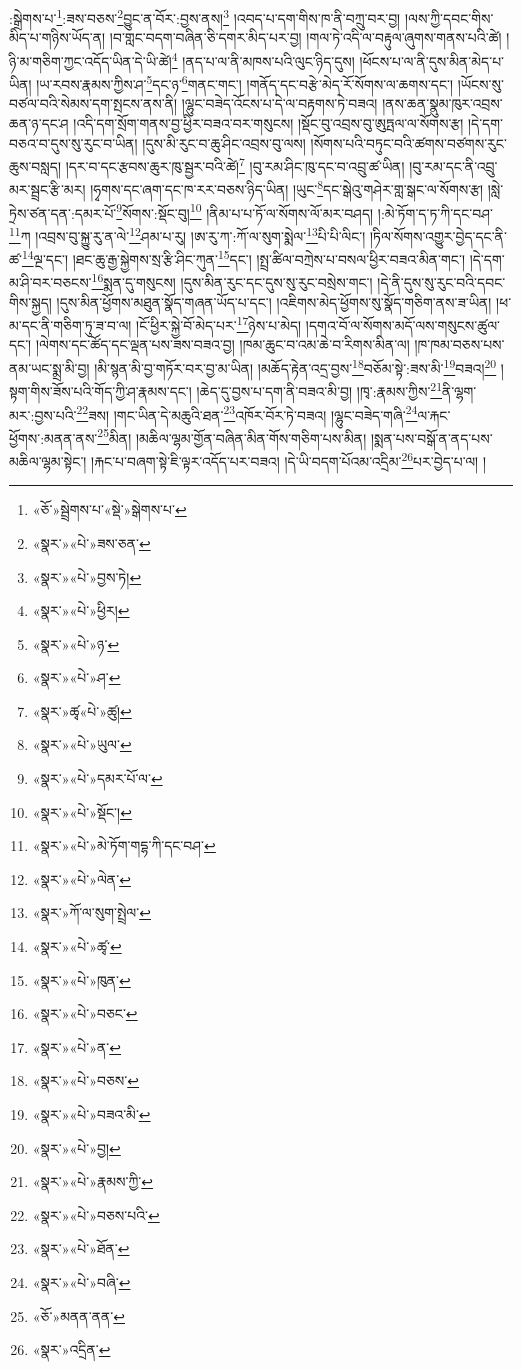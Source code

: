 :སྒྲེགས་པ་\footnote{«ཅོ་»སྦྲེགས་པ་«སྡེ་»སྒེགས་པ་}:ཟས་བཅས་\footnote{«སྣར་»«པེ་»ཟས་ཅན་}བྱུང་ན་བོར་:བྱས་ནས།\footnote{«སྣར་»«པེ་»བྱས་ཏེ།} །འབད་པ་དག་གིས་ཁ་ནི་བཀྲུ་བར་བྱ། །ལས་ཀྱི་དབང་གིས་མིད་པ་གཉིས་ཡོད་ན། །བ་གླང་བདག་བཞིན་ཅི་དགར་མིད་པར་བྱ། །གལ་ཏེ་འདི་ལ་བརྟུལ་ཞུགས་གནས་པའི་ཚེ། །ཉི་མ་གཅིག་ཀྱང་འདོད་ཡིན་དེ་ཡི་ཚེ།\footnote{«སྣར་»«པེ་»ཕྱིར།} །ནད་པ་ལ་ནི་མཁས་པའི་ལུང་ཉིད་དུས། །ཕོངས་པ་ལ་ནི་དུས་མིན་མེད་པ་ཡིན། །ཡ་རབས་རྣམས་ཀྱིས་ཤ་\footnote{«སྣར་»«པེ་»ཉ་}དང་ཉ་\footnote{«སྣར་»«པེ་»ཤ་}གནང་གང་། །གནོད་དང་བརྩེ་མེད་རོ་སོགས་ལ་ཆགས་དང་། །ཡོངས་སུ་བཙལ་བའི་སེམས་དག་སྤངས་ནས་ནི། །ལྷུང་བཟེད་འོངས་པ་དེ་ལ་བརྟགས་ཏེ་བཟའ། །ནས་ཆན་སྣུམ་ཁུར་འབྲས་ཆན་ཉ་དང་ཤ །འདི་དག་སྲོག་གནས་བྱ་ཕྱིར་བཟའ་བར་གསུངས། །སྡོང་བུ་འབྲས་བུ་ཨུཏྤལ་ལ་སོགས་རྩ། །དེ་དག་བཅའ་བ་དུས་སུ་རུང་བ་ཡིན། །དུས་མི་རུང་བ་ཆུ་ཤིང་འབྲས་བུ་ལས། །སོགས་པའི་བཏུང་བའི་ཚགས་བཙགས་རུང་ཆུས་བསླད། །དར་བ་དང་རྩབས་ཆུར་ཁུ་སྦྱར་བའི་ཚེ།\footnote{«སྣར་»ཚྭ«པེ་»ཚུ།} །བུ་རམ་ཤིང་ཁུ་དང་བ་འབྲུ་ཚ་ཡིན། །བུ་རམ་དང་ནི་འབྲུ་མར་སྦྲང་རྩི་མར། །ཧྭགས་དང་ཞག་དང་ཁ་རར་བཅས་ཉིད་ཡིན། །ཡུང་\footnote{«སྣར་»«པེ་»ཡུལ་}དང་སྒེའུ་གཤེར་གླ་སྒང་ལ་སོགས་རྩ། །སླེ་ཏྲེས་ཙན་དན་:དམར་པོ་\footnote{«སྣར་»«པེ་»དམར་པོ་ལ་}སོགས་:སྡོང་བུ།\footnote{«སྣར་»«པེ་»སྡོང་།} །ནིམ་པ་པ་ཏོ་ལ་སོགས་ལོ་མར་བཤད། །:མེ་ཏོག་ད་ཏ་ཀི་དང་བཤ་\footnote{«སྣར་»«པེ་»མེ་ཏོག་གདྷ་ཀི་དང་བཤ་}ཀ །འབྲས་བུ་སྐྱུ་རུ་ན་ལེ་\footnote{«སྣར་»«པེ་»ལེན་}ཤམ་པ་རུ། །ཨ་རུ་ཀ་:ཀོ་ལ་སུག་སྨེལ་\footnote{«སྣར་»ཀོ་ལ་སུག་སྤྲེལ་}པི་པི་ལིང་། །ཏིལ་སོགས་འགྱུར་བྱེད་དང་ནི་ཚ་\footnote{«སྣར་»«པེ་»ཚྭ་}ལྔ་དང་། །ཐང་ཆུ་རྒྱ་སྐྱེགས་སྲ་རྩི་ཤིང་ཀུན་\footnote{«སྣར་»«པེ་»ཁུན་}དང་། །སྤྲ་ཚིལ་བཀྲེས་པ་བསལ་ཕྱིར་བཟའ་མིན་གང་། །དེ་དག་མ་ཤི་བར་བཅངས་\footnote{«སྣར་»«པེ་»བཅང་}སྨན་དུ་གསུངས། །དུས་མིན་རུང་དང་དུས་སུ་རུང་བསྲེས་གང་། །དེ་ནི་དུས་སུ་རུང་བའི་དབང་གིས་སྐྱད། །དུས་མིན་ཕྱོགས་མཐུན་སྣོད་གཞན་ཡོད་པ་དང་། །འཇིགས་མེད་ཕྱོགས་སུ་སྣོད་གཅིག་ནས་ཟ་ཡིན། །ཕ་མ་དང་ནི་གཅིག་ཏུ་ཟ་བ་ལ། །ངོ་ཕྱིར་སྐྱེ་བོ་མེད་པར་\footnote{«སྣར་»«པེ་»ན་}ཉེས་པ་མེད། །དགའ་བོ་ལ་སོགས་མདོ་ལས་གསུངས་ཚུལ་དང་། །ལེགས་དང་ཚོད་དང་ལྡན་པས་ཟས་བཟའ་བྱ། །ཁམ་ཆུང་བ་འམ་ཆེ་བ་རིགས་མིན་ལ། །ཁ་ཁམ་བཅས་པས་ནམ་ཡང་སྨྲ་མི་བྱ། །མི་སྙན་མི་བྱ་གཏོར་བར་བྱ་མ་ཡིན། །མཆོད་རྟེན་འདྲ་བྱས་\footnote{«སྣར་»«པེ་»བཅས་}བཅོམ་སྟེ་:ཟས་མི་\footnote{«སྣར་»«པེ་»བཟའ་མི་}བཟའ།\footnote{«སྣར་»«པེ་»བྱ།} །སྟག་གིས་ཟོས་པའི་གོད་ཀྱི་ཤ་རྣམས་དང་། །ཆེད་དུ་བྱས་པ་དག་ནི་བཟའ་མི་བྱ། །ཁྭ་:རྣམས་ཀྱིས་\footnote{«སྣར་»«པེ་»རྣམས་ཀྱི་}ནི་ལྷག་མར་:བྱས་པའི་\footnote{«སྣར་»«པེ་»བཅས་པའི་}ཟས། །གང་ཡིན་དེ་མཆུའི་ཐན་\footnote{«སྣར་»«པེ་»ཐོན་}འཁོར་བོར་ཏེ་བཟའ། །ལྷུང་བཟེད་གཞི་\footnote{«སྣར་»«པེ་»བཞི་}ལ་རྐང་ཕྱོགས་:མནན་ནས་\footnote{«ཅོ་»མནན་ནན་}མིན། །མཆིལ་ལྷམ་གྱོན་བཞིན་མིན་གོས་གཅིག་པས་མིན། །སྨན་པས་བསྒོ་ན་ནད་པས་མཆིལ་ལྷམ་སྟེང་། །རྐང་པ་བཞག་སྟེ་ཇི་ལྟར་འདོད་པར་བཟའ། །དེ་ཡི་བདག་པོའམ་འདྲིམ་\footnote{«སྣར་»འདྲིན་}པར་བྱེད་པ་ལ། །
